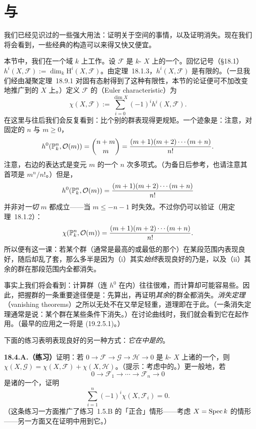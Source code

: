 
\section{\trRiemannRoch{}与\trArithmeticGenus}

我们已经见识过\trCechCohomology{}的一些强大用法：证明关于\trGlobalSections{}空间的事情，以及证明\trSerre{}消失。现在我们将会看到，一些经典的构造可以来得又快又便宜。

本节中，我们在一个域 $k$ 上工作。设 $\mathscr{F}$ 是\trProjective{} $k$-\trScheme{} $X$ 上的一个\trCoherentSheaf。回忆记号（\S18.1）$h^i(X,\mathscr{F}):=\dim_k\mathrm{H}^i(X,\mathscr{F})$。由\mbox{定理~18.1.3}，$h^i(X,\mathscr{F})$ 是有限的。（一旦我们经由\trGrothendieck{}凝聚定理~\mbox{18.9.1} 对固有态射得到了这种有限性，本节的论证便可不加改变地推广到\trProper{}的 $X$ 上。）定义 $\mathscr{F}$ 的\textbf{\trEulerCharacteristic}（Euler characteristic）为
\[
\chi(X,\mathscr{F}):=\sum_{i=0}^{\dim X}(-1)^i h^i(X,\mathscr{F}).
\]
在这里与往后我们会反复看到：\trEulerCharacteristic{}比个别的\trCohomology{}群表现得更规矩。一个迹象是：注意，对固定的 $n$ 与 $m\ge 0$，
\[
h^0(\mathbb{P}^n_k,\mathcal{O}(m))=\binom{n+m}{m}=\frac{(m+1)(m+2)\cdots(m+n)}{n!}.
\]
注意，右边的表达式是变元 $m$ 的一个 $n$ 次多项式。（为备日后参考，也请注意其首项是 $m^n/n!$。）但是，
\[
h^0(\mathbb{P}^n_k,\mathcal{O}(m))=\frac{(m+1)(m+2)\cdots(m+n)}{n!}
\]
并非对\emph{一切} $m$ 都成立——当 $m\le -n-1$ 时失效。不过你仍可以验证（用\mbox{定理~18.1.2}）：
\[
\chi(\mathbb{P}^n_k,\mathcal{O}(m))=\frac{(m+1)(m+2)\cdots(m+n)}{n!}.
\]
所以便有这一课：若某个\trCohomology{}群（通常是最高的或最低的那个）在某段范围内表现良好，随后却乱了套，那么多半是因为（i）其实\emph{始终}表现良好的乃是\trEulerCharacteristic，以及（ii）其余的\trCohomology{}群在那段范围内全都消失。

事实上我们将会看到：计算\trCohomology{}群（连 $h^0$ 在内）往往很难，而计算\trEulerCharacteristic{}却可能容易些。因此，把握\trCohomology{}群的一条重要途径便是：先算出\trEulerCharacteristic，再证明\emph{其余}的\trCohomology{}群全都消失。\emph{消失定理}（vanishing theorems）之所以无处不在又举足轻重，道理即在于此。（一条消失定理通常是说：某个\trCohomology{}群在某些条件下消失。）在讨论曲线时，我们就会看到它在起作用。（最早的应用之一将是 \mbox{(19.2.5.1)}。）

下面的练习表明\trEulerCharacteristic{}表现良好的另一种方式：\emph{它在\trExactSequence{}中是\trAdditive{}的}。

\textbf{18.4.A.（练习）}\quad 证明：若 $0\to\mathscr{F}\to\mathscr{G}\to\mathscr{H}\to 0$ 是\trProjective{} $k$-\trScheme{} $X$ 上诸\trCoherentSheaf{}的一个\trExactSequence，则 $\chi(X,\mathscr{G})=\chi(X,\mathscr{F})+\chi(X,\mathscr{H})$。（提示：考虑\trCohomology{}中的\trLongExactSequence。）更一般地，若
\[
0\longrightarrow\mathscr{F}_1\longrightarrow\cdots\longrightarrow\mathscr{F}_n\longrightarrow 0
\]
是诸\trCoherentSheaf{}的一个\trExactSequence，证明
\[
\sum_{i=1}^{n}(-1)^i\chi(X,\mathscr{F}_i)=0.
\]
（这条练习一方面推广了\mbox{练习~1.5.B} 的「正合」情形——考虑 $X=\operatorname{Spec} k$ 的情形——另一方面又在证明中用到它。）

